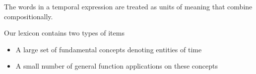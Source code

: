 

The words in a temporal expression are treated as units of meaning that
	combine compositionally.

Our lexicon contains two types of items
\begin{itemize}
	\item A large set of fundamental concepts denoting entities of time
	\item A small number of general function applications on these concepts
\end{itemize}
\dome
